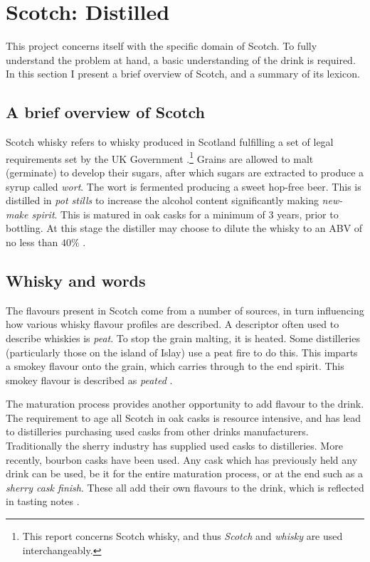 \section{Scotch: Distilled}\label{sec:whisky}
This project concerns itself with the specific domain of Scotch. To fully understand the problem at hand, a basic
understanding of the drink is required.  In this section I present a brief overview of Scotch, 
and a summary of its lexicon.

\subsection{A brief overview of Scotch}
Scotch whisky refers to whisky produced in Scotland fulfilling a set of legal requirements set by the UK Government 
\cite{legislation.gov.uk_2009}.\footnote{This report concerns Scotch whisky, and thus \emph{Scotch} and \emph{whisky} 
are used interchangeably.}  Grains are allowed to malt (germinate) to develop their sugars, after which sugars are
extracted to produce a syrup called \emph{wort}.  The wort is fermented producing a sweet hop-free beer.  This is
distilled in \emph{pot stills} to increase the alcohol content significantly making \emph{new-make spirit}. This
is matured in oak casks for a minimum of 3 years, prior to bottling.  At this stage the distiller may choose
to dilute the whisky to an ABV of no less than $40\%$ \cite{Jacques2003, Pyke1965}.

\subsection{Whisky and words}
The flavours present in Scotch come from a number of sources, in turn influencing how various whisky
flavour profiles are described.  A descriptor often used to describe whiskies is \emph{peat}.
To stop the grain malting, it is heated. Some distilleries (particularly those on the island of Islay) use
a peat fire to do this.  This imparts a smokey flavour onto the grain, which carries through to the end spirit.
This smokey flavour is described as \emph{peated} \cite{Jacques2003, Bathgate2019}.

The maturation process provides another opportunity to add flavour to the drink.  The requirement to age all Scotch in 
oak casks is resource intensive, and has lead to distilleries purchasing used casks from other drinks manufacturers.
Traditionally the sherry industry has supplied used casks to distilleries. More recently, bourbon casks have been 
used.  Any cask which has previously held any drink can be used, be it for the entire maturation process, or at the end
such as a \emph{sherry cask finish}.  These all add their own flavours to the drink, which is reflected in 
tasting notes \cite{Jacques2003, Mosedale1998}.